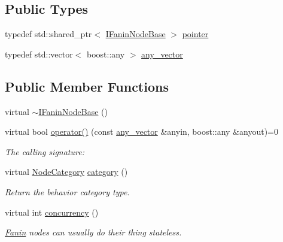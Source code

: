 \subsection*{Public Types}
\begin{DoxyCompactItemize}
\item 
typedef std\+::shared\+\_\+ptr$<$ \hyperlink{class_wire_cell_1_1_i_fanin_node_base}{I\+Fanin\+Node\+Base} $>$ \hyperlink{class_wire_cell_1_1_i_fanin_node_base_ad68050255fd53c8b9a129083299bca2d}{pointer}
\item 
typedef std\+::vector$<$ boost\+::any $>$ \hyperlink{class_wire_cell_1_1_i_fanin_node_base_a9dc315fe5b56f41f13ea247fc4b7f34b}{any\+\_\+vector}
\end{DoxyCompactItemize}
\subsection*{Public Member Functions}
\begin{DoxyCompactItemize}
\item 
virtual \hyperlink{class_wire_cell_1_1_i_fanin_node_base_a34a12b984eb778c5fbc443c9f7eae666}{$\sim$\+I\+Fanin\+Node\+Base} ()
\item 
virtual bool \hyperlink{class_wire_cell_1_1_i_fanin_node_base_a7fd741cc204d2eb03402709bff0694f2}{operator()} (const \hyperlink{class_wire_cell_1_1_i_fanin_node_base_a9dc315fe5b56f41f13ea247fc4b7f34b}{any\+\_\+vector} \&anyin, boost\+::any \&anyout)=0
\begin{DoxyCompactList}\small\item\em The calling signature\+: \end{DoxyCompactList}\item 
virtual \hyperlink{class_wire_cell_1_1_i_node_a5546e64cbb70bd3ac787295cac9ac803}{Node\+Category} \hyperlink{class_wire_cell_1_1_i_fanin_node_base_a1eadd634e7beaafcd7d0e93ea35a6f3b}{category} ()
\begin{DoxyCompactList}\small\item\em Return the behavior category type. \end{DoxyCompactList}\item 
virtual int \hyperlink{class_wire_cell_1_1_i_fanin_node_base_af0f007d93e510830bccbc186c6642749}{concurrency} ()
\begin{DoxyCompactList}\small\item\em \hyperlink{struct_wire_cell_1_1_fanin}{Fanin} nodes can usually do their thing stateless. \end{DoxyCompactList}\end{DoxyCompactItemize}



